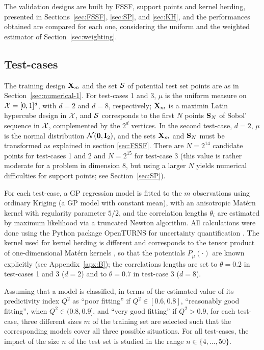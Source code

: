 The validation designs are built by FSSF, support points and kernel herding, presented in Sections~\ref{sec:FSSF}, \ref{sec:SP}, and \ref{sec:KH}, 
and the performances obtained are compared for each one, considering the uniform and the weighted estimator of Section~\ref{sec:weighting}. 

\subsection{Test-cases} \label{sec:testCases}

The training design ${\bf X}_m$ and the set $\mathcal{S}$ of potential test set points are as in Section~\ref{sec:numerical-1}. 
For test-cases 1 and 3, $\mu$ is the uniform measure on $\mathcal{X}=[0,1]^d$, with $d=2$ and $d=8$, respectively; ${\bf X}_m$ is a maximin Latin hypercube design in $\mathcal{X}$, and $\mathcal{S}$ corresponds to the first $N$ points $\mathbf{S}_N$ of Sobol' sequence in $\mathcal{X}$, complemented by the $2^d$ vertices. 
In the second test-case, $d=2$, $\mu$ is the normal distribution $\SN(\0b,\Ib_2)$, and the sets ${\bf X}_m$ and $\mathbf{S}_N$ must be transformed as explained in section \ref{sec:FSSF}. 
There are $N=2^{14}$ candidate points for test-cases 1 and 2 and $N=2^{15}$ for test-case 3 (this value is rather moderate for a problem in dimension 8, but using a larger $N$ yields numerical difficulties for support points; see Section~\ref{sec:SP}). 

For each test-case, a GP regression model is fitted to the $m$ observations using ordinary Kriging \cite{rasmussen_2006} (a GP model with constant mean), with an anisotropic Matérn kernel with regularity parameter $5/2$, and the correlation lengths $\theta_i$ are estimated by maximum likelihood via a truncated Newton algorithm. 
All calculations were done using the Python package OpenTURNS for uncertainty quantification \cite{baudin_dutfoy_2017}. 
The kernel used for kernel herding is different and corresponds to the tensor product of one-dimensional Matérn kernels , so that the potentials $P_{\mu}(\cdot)$ are known explicitly (see Appendix~\ref{apx:B}); the correlations lengths are set to $\theta=0.2$ in test-cases 1 and 3 ($d=2$) and to $\theta=0.7$ in test-case 3 ($d=8$).

Assuming that a model is classified, in terms of the estimated value of its predictivity index $Q^2$ as ``poor fitting'' if $Q^2\in[0.6, 0.8]$, ``reasonably good fitting'', when $Q^2\in(0.8,0.9]$, and ``very good fitting'' if $Q^2>0.9$, for each test-case, three different sizes $m$ of the training set are selected such that the corresponding models cover all three possible situations. 
For all test-cases, the impact of the size $n$ of the test set is studied in the range $n\in\{4 ,\ldots,50\}$.

